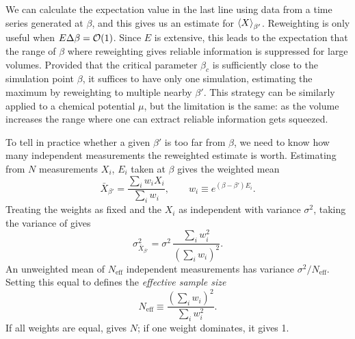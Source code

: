 We can calculate the expectation value in the last line
using data from a time series generated at $\beta$, and this gives us an
estimate for $\ev{X}_{\beta'}$. Reweighting is only useful when
$E\Delta\beta=\order{1}$. Since $E$ is extensive, this leads to the
expectation that the range of $\beta$ where reweighting gives reliable
information is suppressed for large volumes. 
Provided that the critical parameter $\beta_c$
is sufficiently close to the simulation point $\beta$, it suffices
to have only one simulation, estimating the maximum by reweighting to
multiple nearby $\beta'$. This strategy can be similarly applied
to a chemical potential $\mu$, but the limitation is the same: as
the volume increases the range where one can extract reliable
information gets squeezed.

To tell in practice whether a given $\beta'$ is too far from $\beta$, we
need to know how many independent measurements the reweighted estimate is worth.
Estimating  from $N$ measurements $X_i$, $E_i$ taken at $\beta$
gives the weighted mean
\begin{equation}\label{eq:RWwmean}
  \bar{X}_{\beta'}=\frac{\sum_i w_iX_i}{\sum_i w_i},\qquad
  w_i\equiv e^{(\beta-\beta')E_i}.
\end{equation}
Treating the weights as fixed and the $X_i$ as independent with variance
$\sigma^2$, taking the variance of  gives
\begin{equation}\label{eq:RWvar}
  \sigma^2_{\bar{X}_{\beta'}}=\sigma^2\,\frac{\sum_iw_i^2}{\left(\sum_iw_i\right)^2}.
\end{equation}
An unweighted mean of $N_\text{eff}$ independent measurements has variance
$\sigma^2/N_\text{eff}$. Setting this equal to  defines the
{\it effective sample size}
\begin{equation}\label{eq:Neff}
  N_\text{eff}\equiv\frac{\left(\sum_iw_i\right)^2}{\sum_iw_i^2}.
\end{equation}
If all weights are equal,
 gives $N$; if one weight dominates, it gives 1.

